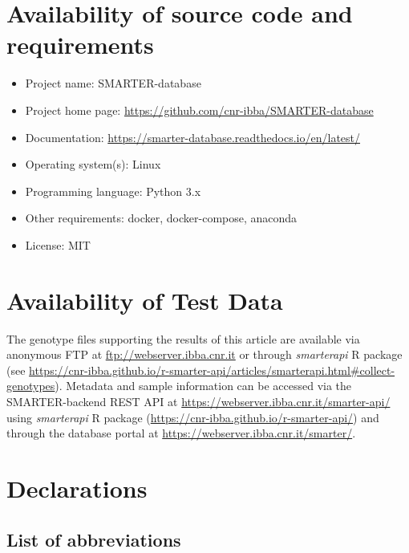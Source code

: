 \documentclass[a4paper,num-refs,gigabyte]{oup-contemporary}
\begin{document}
\section{Availability of source code and requirements}

\begin{itemize}
\item Project name: SMARTER-database
\item Project home page: \url{https://github.com/cnr-ibba/SMARTER-database}
\item Documentation: \url{https://smarter-database.readthedocs.io/en/latest/}
\item Operating system(s): Linux
\item Programming language: Python 3.x
\item Other requirements: docker, docker-compose, anaconda
\item License: MIT
\end{itemize}

\section{Availability of Test Data}

The genotype files supporting the results of this article are available via anonymous FTP at \url{ftp://webserver.ibba.cnr.it} or through \emph{smarterapi} R package (see \url{https://cnr-ibba.github.io/r-smarter-api/articles/smarterapi.html#collect-genotypes}). Metadata and sample information can be accessed via the SMARTER-backend REST API at \url{https://webserver.ibba.cnr.it/smarter-api/} using \emph{smarterapi} R package (\url{https://cnr-ibba.github.io/r-smarter-api/}) and through the database portal at \url{https://webserver.ibba.cnr.it/smarter/}.

\section{Declarations}

\subsection{List of abbreviations}
\end{document}
